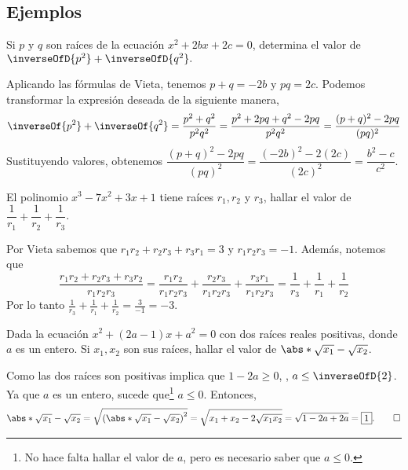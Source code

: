 \subsection{Ejemplos}

\begin{example}
    Si $p$ y $q$ son raíces de la ecuación $x^2 + 2bx + 2c = 0$, determina el valor de $\inverseOfD{p^2} + \inverseOfD{q^2}.$
\end{example}
\begin{solution}
    Aplicando las fórmulas de Vieta, tenemos $p + q = - 2b$ y $pq = 2c$.
    Podemos transformar la expresión deseada de la siguiente manera,
    \[
        \inverseOf{p^2} + \inverseOf{q^2} = \frac{p^2 + q^2}{p^2 q^2} = \frac{p^2 + 2pq + q^2 - 2pq}{p^2 q^2} = \frac{ (p + q)^2 - 2pq}{(pq)^2}
    \]
    Sustituyendo valores, obtenemos $\dfrac{(p + q)^2 - 2pq}{(pq)^2} = \dfrac{ (-2b)^2 - 2(2c)}{(2c)^2} = \boxed{\dfrac{b^2 - c}{c^2}}$.
\end{solution}

\begin{example}
    El polinomio $x^3 - 7 x^2 + 3x + 1$ tiene raíces $r_1, r_2$ y  $r_3$, hallar el valor de $\dfrac{1}{r_1} + \dfrac{1}{r_2} + \dfrac{1}{r_3}$.
\end{example}
\begin{solution}
    Por Vieta sabemos que $r_1 r_2 + r_2 r_3 + r_3 r_1 = 3$ y $r_1 r_2 r_3 = -1$.
    Además, notemos que
    \[
        \frac{r_1 r_2 + r_2 r_3 + r_3 r_2}{r_1 r_2 r_3} = \frac{r_1 r_2}{r_1 r_2 r_3} + \frac{r_2 r_3}{r_1 r_2 r_3} + \frac{r_3 r_1}{r_1 r_2 r_3} = \frac{1}{r_3} + \frac{1}{r_1} + \frac{1}{r_2}
    \]
    Por lo tanto $\frac{1}{r_3} + \frac{1}{r_1} + \frac{1}{r_2} = \frac{3}{-1} = \boxed{-3}$.
\end{solution}

\begin{example}[China, 1997]
    Dada la ecuación $x^2 + (2a - 1)x + a^2 = 0$ con dos raíces reales positivas, donde $a$ es un entero.
    Si $x_1, x_2$ son sus raíces, hallar el valor de $\abs*{\sqrt {x_1} - \sqrt {x_2}}$.
\end{example}
\begin{solution}
    Como las dos raíces son positivas implica que $1 - 2a \geq 0$, \ie, $a \leq \inverseOfD{2}$.
    Ya que $a$ es un entero, sucede que\footnote{No hace falta hallar el valor de $a$, pero es necesario saber que $a \leq 0$.} $a \leq 0$.
    Entonces,
    \[
        \abs*{\sqrt {x_1} - \sqrt {x_2}} = \sqrt {\left(\abs*{\sqrt {x_1} - \sqrt {x_2}}\right)^2}
        = \sqrt {x_1 + x_2 - 2\sqrt {x_1 x_2}}
        = \sqrt {1 - 2a + 2a}
        = \boxed{1}. \qedhere
    \]
\end{solution}

